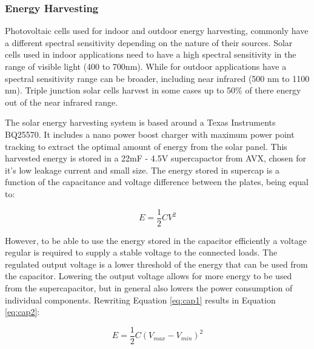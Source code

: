 \documentclass[letterpaper, 10 pt, conference]{ieeeconf}  %
\begin{document}
\subsubsection{Energy Harvesting}


Photovoltaic cells used for indoor and outdoor energy harvesting, commonly have a different spectral sensitivity depending on the nature of their sources.
Solar cells used in indoor applications need to have a high spectral sensitivity in the range of visible light (400 to 700nm).
While for outdoor applications have a spectral sensitivity range can be broader, including near infrared  (500 nm to 1100 nm).
Triple junction solar cells harvest in some cases up to 50\% of there energy out of the near infrared range.


The solar energy harvesting system is based around a Texas Instruments BQ25570. 
It includes a nano power boost charger with maximum power point tracking to extract the optimal amount of energy from the solar panel. 
This harvested energy is stored in a 22mF - 4.5V supercapactor from AVX, chosen for it's low leakage current and small size.
The energy stored in supercap is a function of the capacitance and voltage difference between the plates, being equal to:

\begin{equation}
\label{eq:cap1}
E = \frac{1}{2}CV^{2}
\end{equation}

However, to be able to use the energy stored in the capacitor efficiently a voltage regular is required to supply a stable voltage to the connected loads.
The regulated output voltage is a lower threshold of the energy that can be used from the capacitor.
Lowering the output voltage allows for more energy to be used from the supercapacitor, but in general also lowers the power consumption of individual components. Rewriting Equation \ref{eq:cap1} results in Equation \ref{eq:cap2}:

\begin{equation}
\label{eq:cap2}
E = \frac{1}{2}C(V_{max} - V_{min})^{2}
\end{equation}
\end{document}
